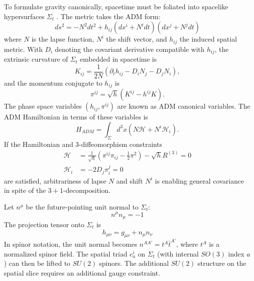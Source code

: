 \documentclass[11pt,a4paper]{article}
\theoremstyle{definition}
\begin{document}
	To formulate gravity canonically, spacetime must be foliated into spacelike hypersurfaces $\Sigma_t$ \cite{arnowitt2008}. The metric takes the ADM form:
	\begin{equation}
		ds^2 = -N^2 dt^2 + h_{ij}(dx^i + N^i dt)(dx^j + N^j dt)
		\label{eq:adm_metric}
	\end{equation}
	where $N$ is the lapse function, $N^i$ the shift vector, and $h_{ij}$ the induced spatial metric.
	With $D_i$ denoting the covariant derivative compatible with $h_{ij}$,
	the extrinsic curvature of $\Sigma_t$ embedded in spacetime is
	\begin{equation}
		K_{ij} = \frac{1}{2N}(\partial_t h_{ij} - D_i N_j - D_j N_i) ,
		\label{eq:extrinsic_k}
	\end{equation}
	and the momentum conjugate to $h_{ij}$ is
	\begin{equation}
		\pi^{ij} = \sqrt{h}(K^{ij} - h^{ij}K) .
		\label{eq:adm_momentum}
	\end{equation}
	The phase space variables $(h_{ij}, \pi^{ij})$ are known as
	ADM canonical variables. 
	The ADM Hamiltonian in terms of these variables is  
	\begin{equation}
		H_{ADM} = \int_\Sigma d^3x (N\mathcal{H} + N^i\mathcal{H}_i) .
	\end{equation}
	If the Hamiltonian and $3$-diffeomorphism constraints
	\begin{align}
		\mathcal{H} &= \frac{1}{\sqrt{h}}(\pi^{ij}\pi_{ij} - \frac{1}{2}\pi^2) - \sqrt{h}R^{(3)} = 0 \label{eq:ham_constraint}\\
		\mathcal{H}_i &= -2D_j\pi^j_i = 0 \label{eq:diff_constraint}
	\end{align}
	are satisfied, arbitrariness of lapse $N$ and shift $N^i$ is enabling general covariance in spite of the $3+1$-decomposition. 
	
	Let $n^\mu$ be the future-pointing unit normal to $\Sigma_t$:
	\begin{equation}
		n^\mu n_\mu = -1
	\end{equation}
	The projection tensor onto $\Sigma_t$ is
	\begin{equation}
		h_{\mu\nu} = g_{\mu\nu} + n_\mu n_\nu
	\end{equation}
	In spinor notation, the unit normal becomes $n^{AA'} = t^A \bar{t}^{A'}$, where $t^A$ is a normalized spinor field. 
	The spatial triad $e^i_a$ on $\Sigma_t$ (with internal $SO(3)$ index $a$) can then be lifted to $SU(2)$ spinors. 
	The additional $SU(2)$ structure on the spatial slice requires an additional gauge constraint. 
	
\end{document}
